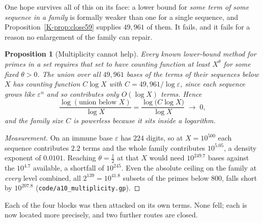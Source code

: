 \documentclass[11pt]{article}
\newtheorem{proposition}[theorem]{Proposition}
\theoremstyle{definition}
\begin{document}
One hope survives all of this on its face: a lower bound for \emph{some term of some sequence in a
family} is formally weaker than one for a single sequence, and Proposition~\ref{K-prop:close59}
supplies $49{,}961$ of them. It fails, and it fails for a reason no enlargement of the family can
repair.

\begin{proposition}[Multiplicity cannot help]\label{prop:multiplicityfail}
Every known lower-bound method for primes in a set requires that set to have counting function at
least $X^{\theta}$ for some fixed $\theta>0$. The union over all $49{,}961$ bases of the terms of
their sequences below $X$ has counting function $C\log X$ with $C=49{,}961/\log\varepsilon$, since
each sequence grows like $\varepsilon^n$ and so contributes only $O(\log X)$ terms. Hence
\[ \frac{\log(\text{union below }X)}{\log X}=\frac{\log\bigl(C\log X\bigr)}{\log X}\;\longrightarrow\;0, \]
and the family size $C$ is powerless because it sits inside a logarithm.
\end{proposition}
\begin{proof}[Measurement]
On an immune base $\varepsilon$ has $224$ digits, so at $X=10^{500}$ each sequence contributes
$2.2$ terms and the whole family contributes $10^{5.05}$, a density exponent of $0.0101$. Reaching
$\theta=\tfrac12$ at that $X$ would need $10^{249.7}$ bases against the $10^{4.7}$ available, a
shortfall of $10^{245}$. Even the absolute ceiling on the family at \emph{every} level combined,
all $2^{139}=10^{41.8}$ subsets of the primes below $800$, falls short by $10^{207.8}$
\textup{(\texttt{code/a10\_multiplicity.gp})}.
\end{proof}

Each of the four blocks was then attacked on its own terms. None fell; each is now located more
precisely, and two further routes are closed.
\end{document}
